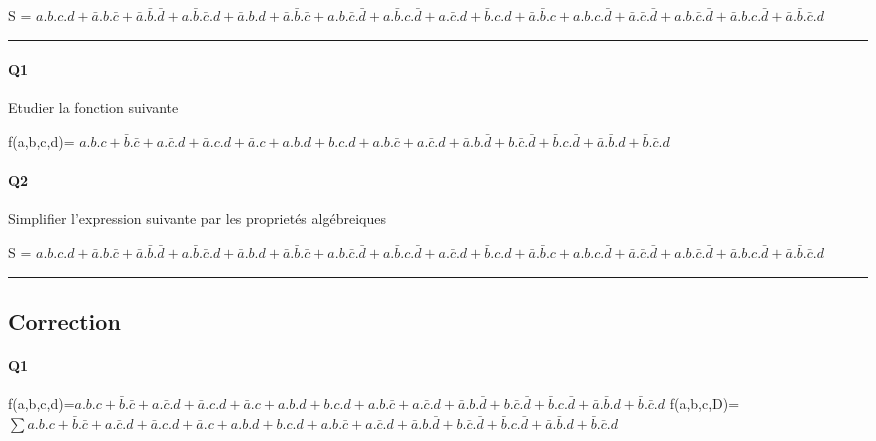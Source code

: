 S = $a.b.c.d+\bar a.b.\bar c+\bar a.\bar b.\bar d+a.\bar b.\bar c.d + \bar a.b.d+\bar a.\bar b.\bar c+a.b.\bar c.\bar d+a.\bar b.c.\bar d + a.\bar c.d+\bar b.c.d+\bar a.\bar b.c+a.b.c.\bar d+\bar a.\bar c.\bar d + a.b.\bar c.\bar d+\bar a.b.c.\bar d+\bar a.\bar b.\bar c.d$

\hrule width 1\linewidth
\paragraph{Q1}

Etudier la fonction suivante

f(a,b,c,d)= $a.b.c+\bar b.\bar c+a.\bar c.d+\bar a.c.d + \bar a.c+a.b.d+b.c.d+a.b.\bar c+a.\bar c.d+\bar a.b.\bar d+b.\bar c.\bar d+\bar b.c.\bar d+\bar a.\bar b.d+\bar b.\bar c.d$

\paragraph{Q2}

Simplifier l'expression suivante par les proprietés algébreiques 

S = $a.b.c.d+\bar a.b.\bar c+\bar a.\bar b.\bar d+a.\bar b.\bar c.d + \bar a.b.d+\bar a.\bar b.\bar c+a.b.\bar c.\bar d+a.\bar b.c.\bar d + a.\bar c.d+\bar b.c.d+\bar a.\bar b.c+a.b.c.\bar d+\bar a.\bar c.\bar d + a.b.\bar c.\bar d+\bar a.b.c.\bar d+\bar a.\bar b.\bar c.d$

\hrule width 1\linewidth\pagebreak
\subsection{Correction}

\paragraph{Q1}

f(a,b,c,d)=$a.b.c+\bar b.\bar c+a.\bar c.d+\bar a.c.d + \bar a.c+a.b.d+b.c.d+a.b.\bar c+a.\bar c.d+\bar a.b.\bar d+b.\bar c.\bar d+\bar b.c.\bar d+\bar a.\bar b.d+\bar b.\bar c.d$
f(a,b,c,D)=$ \sum a.b.c+\bar b.\bar c+a.\bar c.d+\bar a.c.d + \bar a.c+a.b.d+b.c.d+a.b.\bar c+a.\bar c.d+\bar a.b.\bar d+b.\bar c.\bar d+\bar b.c.\bar d+\bar a.\bar b.d+\bar b.\bar c.d $ 

